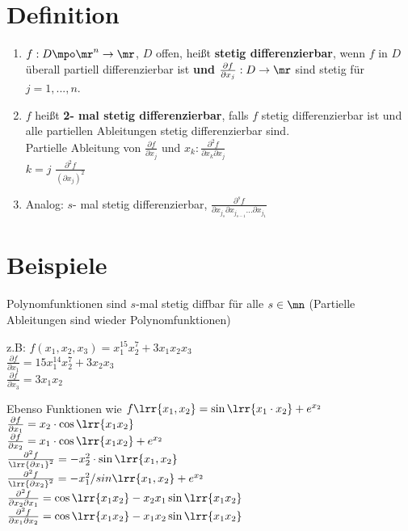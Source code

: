 \section{Definition}
	\begin{enumerate}
		\item $ f: D\mpo\mr^n\rightarrow\mr $, $ D $ offen, heißt \textbf{stetig differenzierbar}, wenn $ f $ in $ D $ überall partiell differenzierbar ist \textbf{und} $ \frac{\partial f}{\partial x_j}:D\rightarrow\mr $ sind stetig für $ j=1,...,n $.
		
		\item  $ f $ heißt \textbf{2- mal stetig differenzierbar}, falls $ f $ stetig differenzierbar ist und alle partiellen Ableitungen stetig differenzierbar sind.\\
		Partielle Ableitung von $ \frac{\partial f}{\partial x_j} $ und $ x_k:\frac{\partial^2 f}{\partial x_k\partial x_j} $\\
		$ k=j $ $ \frac{\partial^2 f}{(\partial x_j)^2} $
		
		\item Analog: $ s $- mal stetig differenzierbar, $ \frac{\partial^s f}{\partial x_{j_{s}}\partial x_{j_{s-1}}...\partial x_{j_{1}}} $
	\end{enumerate}
	
\section{Beispiele}
		\item Polynomfunktionen sind $s$-mal stetig diffbar für alle $s\in\mn$ (Partielle Ableitungen sind wieder Polynomfunktionen)
			
			z.B: $f(x_1,x_2,x_3)=x_1^{15}x_2^7+3x_1x_2x_3$\\
			$\frac{\partial f}{\partial x_1} = 15x_1^{14}x_2^7+3x_2x_3$\\
			$\frac{\partial f}{\partial x_3} = 3x_1x_2$
		\item Ebenso Funktionen wie $f\lrr{x_1,x_2} = \sin\lrr{x_1\cdot x_2}+e^{x_2}$\\
			$\frac{\partial f}{\partial x_1} = x_2\cdot\cos\lrr{x_1x_2}$\\
			$\frac{\partial f}{\partial x_2} = x_1\cdot\cos\lrr{x_1x_2}+e^{x_2}$\\
			$\frac{\partial^2f}{\lrr{\partial x_1}^2} = -x_2^2\cdot\sin\lrr{x_1,x_2}$\\
			$\frac{\partial^2f}{\lrr{\partial x_2}^2} = -x_1^2/sin\lrr{x_1,x_2}+e^{x_2}$\\
			$\frac{\partial^2f}{\partial x_2\partial x_1} = \cos\lrr{x_1x_2}-x_2x_1\sin\lrr{x_1x_2}$\\
			$\frac{\partial^2f}{\partial x_1\partial x_2} = \cos\lrr{x_1x_2}-x_1x_2\sin\lrr{x_1x_2}$
	\subExEnd

